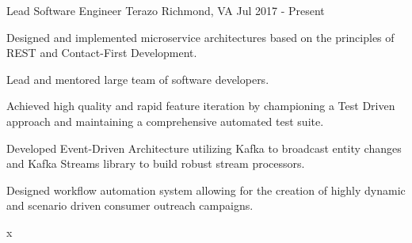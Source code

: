 
\begin{cventries}

  \cventry
  {Lead Software Engineer} %
  {Terazo} %
  {Richmond, VA} %
  {Jul 2017 - Present} %
  {
    \begin{cvitems} %
      \item {Designed and implemented microservice architectures based on the
      principles of REST and Contact-First Development.}
      \item {Lead and mentored large team of software developers.}
      \item {Achieved high quality and rapid feature iteration by championing a
      Test Driven approach and maintaining a comprehensive automated test
      suite.}
      \item {Developed Event-Driven Architecture utilizing Kafka to broadcast
      entity changes and Kafka Streams library to build robust stream
      processors.}
      \item {Designed workflow automation system allowing for the creation of
      highly dynamic and scenario driven consumer outreach campaigns.}
      \item {x}
    \end{cvitems}
  }


\end{cventries}
